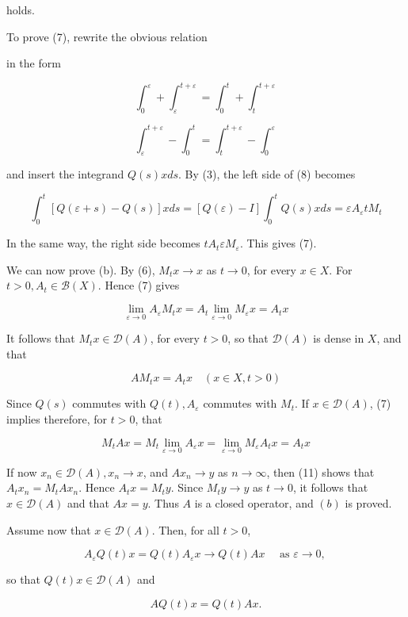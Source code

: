 \documentclass[10pt]{article}
\begin{document}
holds.

To prove (7), rewrite the obvious relation

in the form

$$
\int_{0}^{\varepsilon}+\int_{\varepsilon}^{t+\varepsilon}=\int_{0}^{t}+\int_{t}^{t+\varepsilon}
$$

$$
\int_{\varepsilon}^{t+\varepsilon}-\int_{0}^{t}=\int_{t}^{t+\varepsilon}-\int_{0}^{\varepsilon}
$$

and insert the integrand $Q(s) x d s$. By (3), the left side of (8) becomes

$$
\int_{0}^{t}[Q(\varepsilon+s)-Q(s)] x d s=[Q(\varepsilon)-I] \int_{0}^{t} Q(s) x d s=\varepsilon A_{\varepsilon} t M_{t}
$$

In the same way, the right side becomes $t A_{t} \varepsilon M_{\varepsilon}$. This gives (7).

We can now prove (b). By (6), $M_{t} x \rightarrow x$ as $t \rightarrow 0$, for every $x \in X$. For $t>0, A_{t} \in \mathscr{B}(X)$. Hence (7) gives

$$
\lim _{\varepsilon \rightarrow 0} A_{\varepsilon} M_{t} x=A_{t} \lim _{\varepsilon \rightarrow 0} M_{\varepsilon} x=A_{t} x
$$

It follows that $M_{t} x \in \mathscr{D}(A)$, for every $t>0$, so that $\mathscr{D}(A)$ is dense in $X$, and that

$$
A M_{t} x=A_{t} x \quad(x \in X, t>0)
$$

Since $Q(s)$ commutes with $Q(t), A_{\varepsilon}$ commutes with $M_{t}$. If $x \in \mathscr{D}(A)$, (7) implies therefore, for $t>0$, that

$$
M_{t} A x=M_{t} \lim _{\varepsilon \rightarrow 0} A_{\varepsilon} x=\lim _{\varepsilon \rightarrow 0} M_{\varepsilon} A_{t} x=A_{t} x
$$

If now $x_{n} \in \mathscr{D}(A), x_{n} \rightarrow x$, and $A x_{n} \rightarrow y$ as $n \rightarrow \infty$, then (11) shows that $A_{t} x_{n}=M_{t} A x_{n}$. Hence $A_{t} x=M_{t} y$. Since $M_{t} y \rightarrow y$ as $t \rightarrow 0$, it follows that $x \in \mathscr{D}(A)$ and that $A x=y$. Thus $A$ is a closed operator, and $(b)$ is proved.

Assume now that $x \in \mathscr{D}(A)$. Then, for all $t>0$,

$$
A_{\varepsilon} Q(t) x=Q(t) A_{\varepsilon} x \rightarrow Q(t) A x \quad \text { as } \varepsilon \rightarrow 0 \text {, }
$$

so that $Q(t) x \in \mathscr{D}(A)$ and

$$
A Q(t) x=Q(t) A x .
$$
\end{document}

